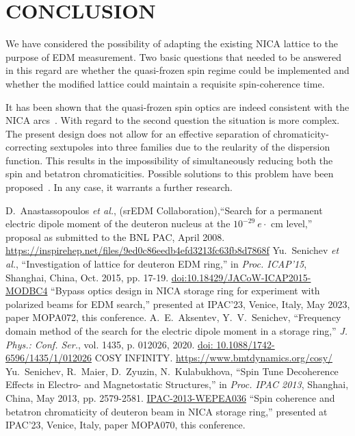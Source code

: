 \documentclass[a4paper]{jacow}
\begin{document}
\section{CONCLUSION}
We have considered the possibility of adapting the existing NICA lattice to the purpose of EDM measurement. Two basic questions that needed to be answered in this regard are whether the quasi-frozen spin regime could be implemented and whether the modified lattice could maintain a requisite spin-coherence time.

It has been shown that the quasi-frozen spin optics are indeed consistent with the NICA arcs~\cite{Kolokolchikov:Bypass}. With regard to the second question the situation is more complex. The present design does not allow for an effective separation of chromaticity-correcting sextupoles into three families due to the reularity of the dispersion function. This results in the impossibility of simultaneously reducing both the spin and betatron chromaticities. Possible solutions to this problem have been proposed~\cite{Kolokolchikov:Coherence}. In any case, it warrants a further research.



\begin{thebibliography}{9}
		D.~Anastassopoulos \textit{et al.}, (srEDM Collaboration),``Search for a permanent electric dipole moment of the deuteron nucleus at the $10^{-29}~e\cdot$ cm level,'' proposal as submitted to the BNL PAC, April 2008. \url{https://inspirehep.net/files/9ed0c86eedb4efd3213fc63fb8d7868f}
		Yu.~Senichev \textit{et al.}, ``Investigation of lattice for deuteron EDM ring,'' in \textit{Proc. ICAP'15}, Shanghai, China, Oct. 2015, pp. 17-19. \url{doi:10.18429/JACoW-ICAP2015-MODBC4}
		``Bypass optics design in NICA storage ring for experiment with polarized beams for EDM search,'' presented at IPAC'23, Venice, Italy, May 2023, paper MOPA072, this conference.
		A.~E.~Aksentev, Y.~V.~Senichev, ``Frequency domain method of the search for the	electric dipole moment in a storage ring,'' \textit{J. Phys.: Conf. Ser.}, vol. 1435, p. 012026, 2020. \url{doi: 10.1088/1742-6596/1435/1/012026}
		COSY INFINITY. 	\url{https://www.bmtdynamics.org/cosy/}
	Yu.~Senichev, R.~Maier, D.~Zyuzin, N.~Kulabukhova, ``Spin Tune Decoherence Effects in Electro- and Magnetostatic Structures,'' in \textit{Proc. IPAC 2013}, Shanghai, China, May 2013, pp. 2579-2581. \url{IPAC-2013-WEPEA036}
	``Spin coherence and betatron chromaticity of deuteron beam in NICA storage ring,'' presented at IPAC'23, Venice, Italy, paper MOPA070, this conference.
\end{thebibliography}
\end{document}
